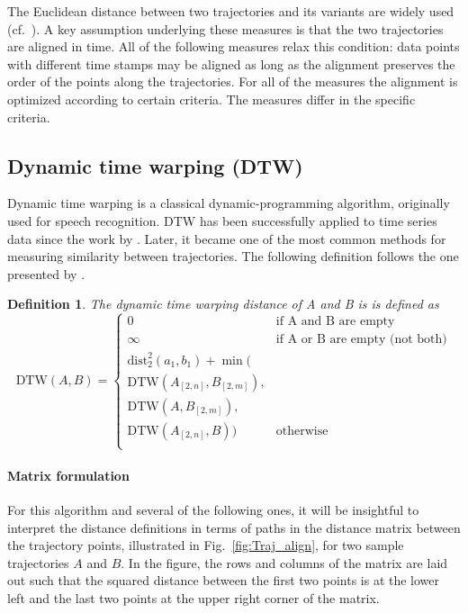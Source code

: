\documentclass{interact}
\newcommand{\dist}{\ensuremath{\text{dist}}}
\newcommand{\DTW}{\ensuremath{\text{DTW}}}
\newtheorem{definition}{Definition}
\begin{document}
The Euclidean distance between two trajectories and its variants are widely used (cf.~\cite{VlachosGK02}). A key assumption underlying these measures is that the two trajectories are aligned in time. All of the following measures relax this condition: data points with different time stamps may be aligned as long as the alignment preserves the order of the points along the trajectories. For all of the measures the alignment is optimized according to certain criteria. The measures differ in the specific criteria.

\subsection{Dynamic time warping (DTW)}
Dynamic time warping is a classical dynamic-programming algorithm, originally used for speech recognition. DTW has been successfully applied to time series data since the work by \cite{BerndtC94}. Later, it became one of the most common methods for measuring similarity between trajectories. The following definition follows the one presented by \cite{ChenOO05}.

\begin{definition}
The dynamic time warping distance of A and B is is defined as
\[
\DTW(A,B) =
\left\{
	\begin{array}{ll}
		0  & \mbox{if A and B are empty} \\
		\infty  & \mbox{if A or B are empty (not both)} \\
		\dist_2^2(a_1,b_1) +
		\min( \\
	\DTW(A_{[2,n]},B_{[2,m]}), \\
			  \DTW(A,B_{[2,m]}),  \\
			\DTW(A_{[2,n]},B)) & \mbox{otherwise } \\
		\end{array}
\right.
\]
\end{definition}

\paragraph*{Matrix formulation}
For this algorithm and several of the following ones, it will be insightful to interpret the distance definitions in terms of paths in the distance matrix between the trajectory points, illustrated in Fig.~\ref{fig:Traj_align}, for two sample trajectories $A$ and $B$.
In the figure, the rows and columns of the matrix are laid out such that the squared distance between the first two points is at the lower left and the last two points at the upper right corner of the matrix.
\end{document}
